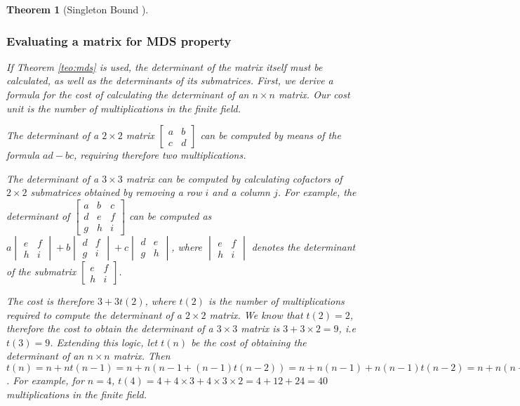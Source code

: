 \documentclass{report}
\newtheorem{theorem}{Theorem}{\bfseries}{\itshape}
\begin{document}
\begin{theorem}[Singleton Bound \cite{SloaneBook}]
\subsubsection{Evaluating a matrix for MDS property}
If Theorem \ref{teo:mds} is used, the determinant of the matrix itself must be calculated, as well as the determinants of its submatrices. First, we derive a formula for the cost of calculating the determinant of an $n \times n$ matrix. Our cost unit is \emph{the number of multiplications in the finite field}.

The determinant of a  $2 \times 2$ matrix $\begin{bmatrix}a & b \\ c & d\end{bmatrix}$ can be computed by means of the formula $ad - bc$, requiring therefore two multiplications. 

The determinant of a $3 \times 3$ matrix can be computed by calculating cofactors of $2 \times 2$ submatrices obtained by removing a row $i$ and a column $j$. For example, the determinant of $\begin{bmatrix}a & b & c\\d & e & f\\g & h & i\end{bmatrix}$ can be computed as $a \begin{vmatrix}e & f\\h & i \end{vmatrix} + b \begin{vmatrix}d & f\\ g & i\end{vmatrix} + c \begin{vmatrix}d & e\\g & h\end{vmatrix}$, where $\begin{vmatrix}e & f\\h & i \end{vmatrix}$ denotes the determinant of the submatrix $\begin{bmatrix}e & f\\h & i \end{bmatrix}$.

The cost is therefore $3 + 3t(2)$, where $t(2)$ is the number of multiplications required to compute the determinant of a $2\times2$ matrix. We know that $t(2) = 2$, therefore the cost to obtain the determinant of a $3\times3$ matrix is $3+3\times2 = 9$, i.e $t(3) = 9$. Extending this logic, let $t(n)$ be the cost of obtaining the determinant of an $n\times n$ matrix. Then $t(n) = n + nt(n-1) = n + n(n-1 + (n-1) t(n-2)) = n + n(n-1) + n(n-1)t(n-2) = n + n(n-1) + n(n-1)(n-2) + ... + n(n-1)(n-2)..2$. For example, for $n = 4$, $t(4) = 4 + 4\times3 + 4\times3\times2 = 4 + 12 + 24 = 40$ multiplications in the finite field.


\end{theorem}
\end{document}
